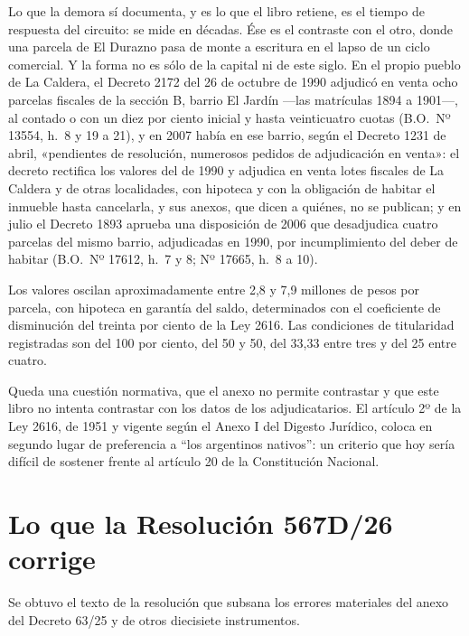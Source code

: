 \begin{cautela}
Lo que la demora sí documenta, y es lo que el libro retiene, es el tiempo de respuesta del circuito: se mide en décadas. Ése es el contraste con el otro, donde una parcela de El Durazno pasa de monte a escritura en el lapso de un ciclo comercial. Y la forma no es sólo de la capital ni de este siglo. En el propio pueblo de La Caldera, el Decreto 2172 del 26 de octubre de 1990 adjudicó en venta ocho parcelas fiscales de la sección B, barrio El Jardín ---las matrículas 1894 a 1901---, al contado o con un diez por ciento inicial y hasta veinticuatro cuotas (B.O.\ Nº 13554, h.\ 8 y 19 a 21), y en 2007 había en ese barrio, según el Decreto 1231 de abril, «pendientes de resolución, numerosos pedidos de adjudicación en venta»: el decreto rectifica los valores del de 1990 y adjudica en venta lotes fiscales de La Caldera y de otras localidades, con hipoteca y con la obligación de habitar el inmueble hasta cancelarla, y sus anexos, que dicen a quiénes, no se publican; y en julio el Decreto 1893 aprueba una disposición de 2006 que desadjudica cuatro parcelas del mismo barrio, adjudicadas en 1990, por incumplimiento del deber de habitar (B.O.\ Nº 17612, h.\ 7 y 8; Nº 17665, h.\ 8 a 10).
\end{cautela}

Los valores oscilan aproximadamente entre 2,8 y 7,9 millones de pesos por parcela, con hipoteca en garantía del saldo, determinados con el coeficiente de disminución del treinta por ciento de la Ley 2616. Las condiciones de titularidad registradas son del 100 por ciento, del 50 y 50, del 33,33 entre tres y del 25 entre cuatro.

Queda una cuestión normativa, que el anexo no permite contrastar y que este libro no intenta contrastar con los datos de los adjudicatarios. El artículo 2º de la Ley 2616, de 1951 y vigente según el Anexo I del Digesto Jurídico, coloca en segundo lugar de preferencia a ``los argentinos nativos'': un criterio que hoy sería difícil de sostener frente al artículo 20 de la Constitución Nacional.

\section{Lo que la Resolución 567D/26 corrige}

Se obtuvo el texto de la resolución que subsana los errores materiales del anexo del Decreto 63/25 y de otros diecisiete instrumentos.

